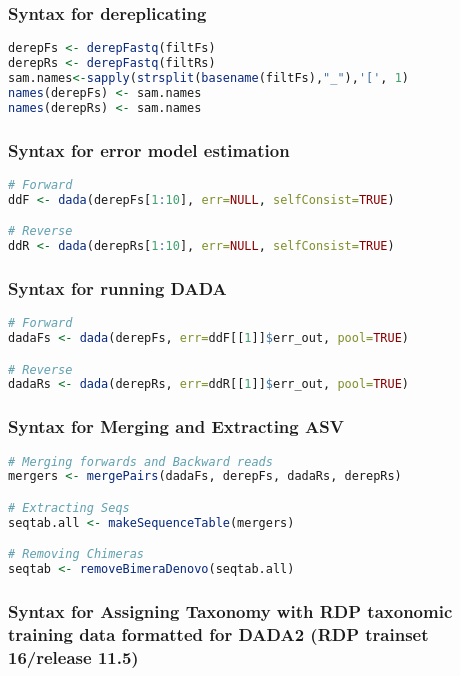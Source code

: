 \subsubsection*{Syntax for dereplicating}

\begin{lstlisting}[language=R]
derepFs <- derepFastq(filtFs)
derepRs <- derepFastq(filtRs)
sam.names<-sapply(strsplit(basename(filtFs),"_"),'[', 1)
names(derepFs) <- sam.names
names(derepRs) <- sam.names
\end{lstlisting}

\subsubsection*{Syntax for error model estimation}

\begin{lstlisting}[language=R]
# Forward
ddF <- dada(derepFs[1:10], err=NULL, selfConsist=TRUE)

# Reverse
ddR <- dada(derepRs[1:10], err=NULL, selfConsist=TRUE)
\end{lstlisting}

\subsubsection*{Syntax for running DADA}

\begin{lstlisting}[language=R]
# Forward
dadaFs <- dada(derepFs, err=ddF[[1]]$err_out, pool=TRUE)

# Reverse
dadaRs <- dada(derepRs, err=ddR[[1]]$err_out, pool=TRUE)
\end{lstlisting}

\subsubsection*{Syntax for Merging and Extracting ASV}

\begin{lstlisting}[language=R]
# Merging forwards and Backward reads
mergers <- mergePairs(dadaFs, derepFs, dadaRs, derepRs)

# Extracting Seqs
seqtab.all <- makeSequenceTable(mergers)

# Removing Chimeras
seqtab <- removeBimeraDenovo(seqtab.all)
\end{lstlisting}

\subsubsection*{Syntax for Assigning Taxonomy with RDP taxonomic training data 
formatted for DADA2 (RDP trainset 16/release 11.5)}

